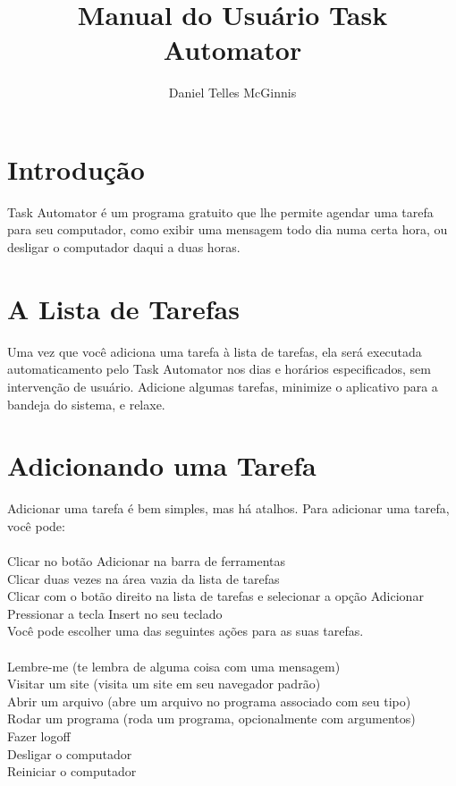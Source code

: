 \documentclass{article}
\begin{document}
\title{Manual do Usuário Task Automator}
\author{Daniel Telles McGinnis}
\maketitle
\section{Introdução}
Task Automator é um programa gratuito que lhe permite agendar uma tarefa para seu computador, como exibir uma mensagem todo dia numa certa hora, ou desligar o computador daqui a duas horas.
\section{A Lista de Tarefas}
Uma vez que você adiciona uma tarefa à lista de tarefas, ela será executada automaticamento pelo Task Automator nos dias e horários especificados, sem intervenção de usuário. Adicione algumas tarefas, minimize o aplicativo para a bandeja do sistema, e relaxe.
\section{Adicionando uma Tarefa}
Adicionar uma tarefa é bem simples, mas há atalhos. Para adicionar uma tarefa, você pode:\\
\\
Clicar no botão Adicionar na barra de ferramentas\\
Clicar duas vezes na área vazia da lista de tarefas\\
Clicar com o botão direito na lista de tarefas e selecionar a opção Adicionar\\
Pressionar a tecla Insert no seu teclado\\

Você pode escolher uma das seguintes ações para as suas tarefas.\\
\\
Lembre-me (te lembra de alguma coisa com uma mensagem)\\
Visitar um site (visita um site em seu navegador padrão)\\
Abrir um arquivo (abre um arquivo no programa associado com seu tipo)\\
Rodar um programa (roda um programa, opcionalmente com argumentos)\\
Fazer logoff\\
Desligar o computador\\
Reiniciar o computador\\
\end{document}
